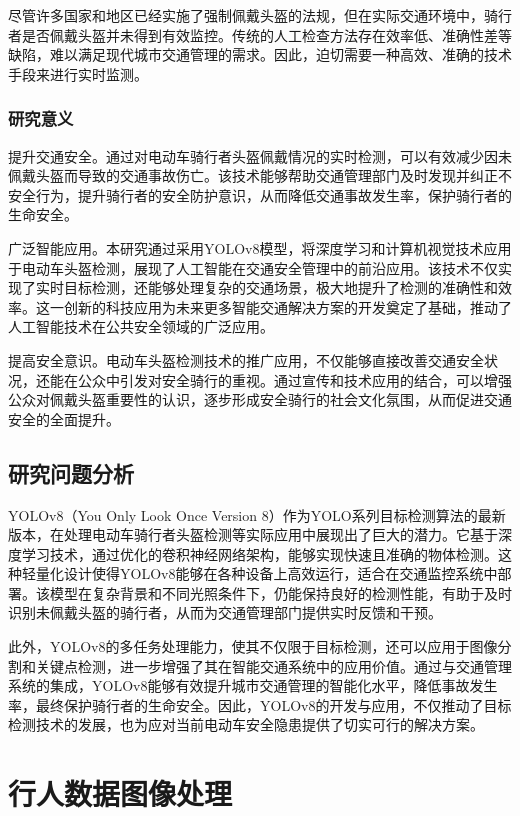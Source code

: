 \documentclass[journal]{IEEEtran}
\numberwithin{figure}{section}%
\begin{document}
尽管许多国家和地区已经实施了强制佩戴头盔的法规，但在实际交通环境中，骑行者是否佩戴头盔并未得到有效监控。传统的人工检查方法存在效率低、准确性差等缺陷，难以满足现代城市交通管理的需求。因此，迫切需要一种高效、准确的技术手段来进行实时监测。
\subsubsection{研究意义}

提升交通安全。通过对电动车骑行者头盔佩戴情况的实时检测，可以有效减少因未佩戴头盔而导致的交通事故伤亡。该技术能够帮助交通管理部门及时发现并纠正不安全行为，提升骑行者的安全防护意识，从而降低交通事故发生率，保护骑行者的生命安全。\par
广泛智能应用。本研究通过采用YOLOv8模型，将深度学习和计算机视觉技术应用于电动车头盔检测，展现了人工智能在交通安全管理中的前沿应用。该技术不仅实现了实时目标检测，还能够处理复杂的交通场景，极大地提升了检测的准确性和效率。这一创新的科技应用为未来更多智能交通解决方案的开发奠定了基础，推动了人工智能技术在公共安全领域的广泛应用。\par
提高安全意识。电动车头盔检测技术的推广应用，不仅能够直接改善交通安全状况，还能在公众中引发对安全骑行的重视。通过宣传和技术应用的结合，可以增强公众对佩戴头盔重要性的认识，逐步形成安全骑行的社会文化氛围，从而促进交通安全的全面提升。\par

\subsection{研究问题分析}
YOLOv8（You Only Look Once Version 8）作为YOLO系列目标检测算法的最新版本，在处理电动车骑行者头盔检测等实际应用中展现出了巨大的潜力。它基于深度学习技术，通过优化的卷积神经网络架构，能够实现快速且准确的物体检测。这种轻量化设计使得YOLOv8能够在各种设备上高效运行，适合在交通监控系统中部署。该模型在复杂背景和不同光照条件下，仍能保持良好的检测性能，有助于及时识别未佩戴头盔的骑行者，从而为交通管理部门提供实时反馈和干预。\par
此外，YOLOv8的多任务处理能力，使其不仅限于目标检测，还可以应用于图像分割和关键点检测，进一步增强了其在智能交通系统中的应用价值。通过与交通管理系统的集成，YOLOv8能够有效提升城市交通管理的智能化水平，降低事故发生率，最终保护骑行者的生命安全。因此，YOLOv8的开发与应用，不仅推动了目标检测技术的发展，也为应对当前电动车安全隐患提供了切实可行的解决方案。
\section{行人数据图像处理}
\end{document}

